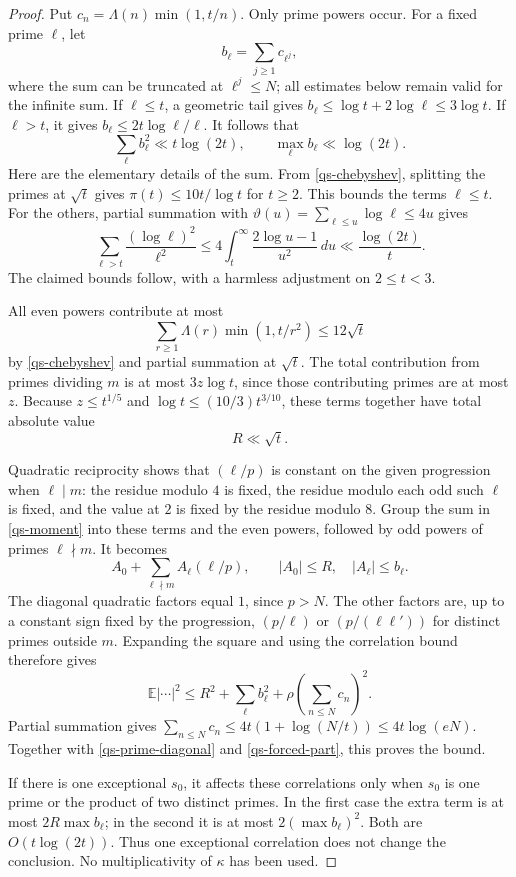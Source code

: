 \begin{proof}
Put $c_n=\Lambda(n)\min(1,t/n)$. Only prime powers occur.
For a fixed prime $\ell$, let
\[
 b_\ell=\sum_{j\ge1}c_{\ell^j},
\]
where the sum can be truncated at $\ell^j\le N$; all estimates
below remain valid for the infinite sum. If $\ell\le t$, a
geometric tail gives $b_\ell\le\log t+2\log\ell\le3\log t$.
If $\ell>t$, it gives
$b_\ell\le2t\log\ell/\ell$.
It follows that
\begin{equation}\label{qs-prime-diagonal}
 \sum_\ell b_\ell^2\ll t\log(2t),\qquad
 \max_\ell b_\ell\ll\log(2t).
\end{equation}
Here are the elementary details of the sum. From
\eqref{qs-chebyshev}, splitting the primes at $\sqrt t$ gives
$\pi(t)\le10t/\log t$ for $t\ge2$.
This bounds the terms $\ell\le t$. For the others, partial
summation with $\vartheta(u)=\sum_{\ell\le u}\log\ell\le4u$
gives
\[
 \sum_{\ell>t}\frac{(\log\ell)^2}{\ell^2}
 \le4\int_t^\infty\frac{2\log u-1}{u^2}\,du
 \ll\frac{\log(2t)}t.
\]
The claimed bounds follow, with a harmless adjustment on $2\le t<3$.

All even powers contribute at most
\[
 \sum_{r\ge1}\Lambda(r)\min(1,t/r^2)\le12\sqrt t
\]
by \eqref{qs-chebyshev} and partial summation at $\sqrt t$.
The total contribution from primes dividing $m$ is at most
$3z\log t$, since those contributing primes are at most $z$.
Because $z\le t^{1/5}$ and
$\log t\le(10/3)t^{3/10}$, these terms together have total
absolute value
\begin{equation}\label{qs-forced-part}
 R\ll\sqrt t.
\end{equation}

Quadratic reciprocity shows that $(\ell/p)$ is constant on the
given progression when $\ell\mid m$: the residue modulo $4$
is fixed, the residue modulo each odd such $\ell$ is fixed, and
the value at $2$ is fixed by the residue modulo $8$.
Group the sum in \eqref{qs-moment} into these terms and the even
powers, followed by odd powers of primes $\ell\nmid m$.
It becomes
\[
 A_0+\sum_{\ell\nmid m}A_\ell(\ell/p),
       \qquad |A_0|\le R,\quad |A_\ell|\le b_\ell.
\]
The diagonal quadratic factors equal $1$, since $p>N$.
The other factors are, up to a constant sign fixed by the
progression, $(p/\ell)$ or $(p/(\ell\ell'))$ for distinct
primes outside $m$. Expanding the square and using the correlation
bound therefore gives
\[
 \mathbb E|\cdots|^2\le R^2+\sum_\ell b_\ell^2
                 +\rho\left(\sum_{n\le N}c_n\right)^2.
\]
Partial summation gives
$\sum_{n\le N}c_n\le4t(1+\log(N/t))\le4t\log(eN)$.
Together with \eqref{qs-prime-diagonal} and
\eqref{qs-forced-part}, this proves the bound.

If there is one exceptional $s_0$, it affects these correlations
only when $s_0$ is one prime or the product of two distinct primes.
In the first case the extra term is at most
$2R\max b_\ell$; in the second it is at most
$2(\max b_\ell)^2$. Both are $O(t\log(2t))$.
Thus one exceptional correlation does not change the conclusion.
No multiplicativity of $\kappa$ has been used.
\end{proof}

